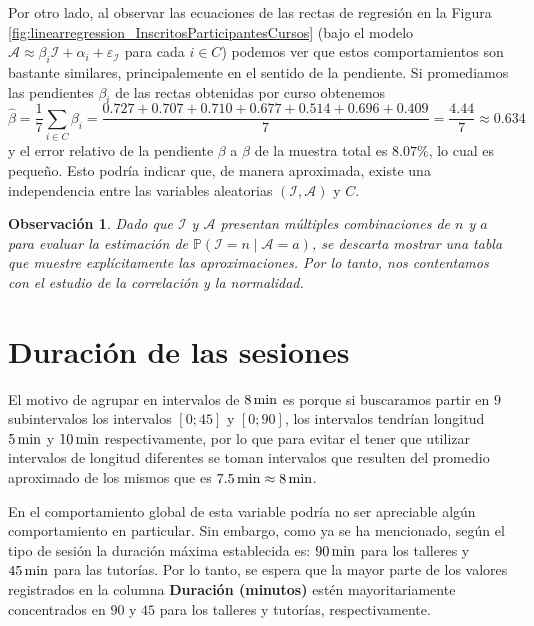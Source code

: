 \documentclass[11pt,a4paper]{book}
\newtheorem{observacion}[teorema]{Observaci\'on}
\theoremstyle{definition}%
\newcommand{\Prob}[1]{\mathds{P}\left( #1 \right)}
\begin{document}
                Por otro lado, al observar las ecuaciones de las rectas de regresión en la Figura \ref{fig:linearregression_InscritosParticipantesCursos} (bajo el modelo $\mathcal{A}\approx\beta_i\mathcal{I}+\alpha_i+\varepsilon_\mathcal{I}$ para cada $i\in C$) podemos ver que estos comportamientos son bastante similares, principalemente en el sentido de la pendiente. Si promediamos las pendientes $\beta_i$ de las rectas obtenidas por curso obtenemos
                \begin{equation*}
                    \hat{\beta}=\frac{1}{7}\sum_{i\in C}\beta_i=\frac{0.727+0.707+0.710+0.677+0.514+0.696+0.409}{7}=\frac{4.44}{7}\approx0.634
                \end{equation*}
                y el error relativo de la pendiente $\beta$ a $\hat{\beta}$ de la muestra total es $8.07\%$, lo cual es pequeño.
                Esto podría indicar que, de manera aproximada, existe una independencia entre las variables aleatorias $(\mathcal{I},\mathcal{A})$ y $C$.

                \begin{observacion}
                    Dado que $\mathcal{I}$ y $\mathcal{A}$ presentan múltiples combinaciones de $n$ y $a$ para evaluar la estimación de $\Prob{\mathcal{I}=n\mid \mathcal{A}=a}$, se descarta mostrar una tabla que muestre explícitamente las aproximaciones. Por lo tanto, nos contentamos con el estudio de la correlación y la normalidad.
                \end{observacion}
        \section{Duración de las sesiones}
            El motivo de agrupar en intervalos de $8\,\textup{min}$ es porque si buscaramos partir en $9$ subintervalos los intervalos $[0;45]$ y $[0;90]$, los intervalos tendrían longitud $5\,\textup{min}$ y $10\,\textup{min}$ respectivamente, por lo que para evitar el tener que utilizar intervalos de longitud diferentes se toman intervalos que resulten del promedio aproximado de los mismos que es $7.5\,\textup{min}\approx8\,\textup{min}$.

            En el comportamiento global de esta variable podría no ser apreciable algún comportamiento en particular. Sin embargo, como ya se ha mencionado, según el tipo de sesión la duración máxima establecida es:  $90\,\textup{min}$ para los talleres y $45\,\textup{min}$ para las tutorías. Por lo tanto, se espera que la mayor parte de los valores registrados en la columna \textbf{Duración (minutos)} estén mayoritariamente concentrados en $90$ y $45$ para los talleres y tutorías, respectivamente.
            
\end{document}
